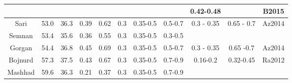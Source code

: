 \begin{table*}[!ht]
\begin{tabular}{ | c | c | c | c | c | c | c | c | c | c | c |}
	 \cline{9-11}	             &  &  &  &  &  &  & & 0.42-0.48 &  & B2015\\ \hline
	 Sari          & 53.0   & 36.3   & 0.39   & 0.62  & 0.3 & 0.35-0.5 &0.5-0.7& 0.3 - 0.35 &  0.65 - 0.7 & Az2014\\ \hline
	 Semnan   & 53.4   & 35.6   & 0.36   & 0.55  & 0.3 & 0.35-0.5 &0.3-0.5&  & & \\ \hline
	 Gorgan    & 54.4   & 36.8    & 0.45  & 0.69  & 0.3 & 0.35-0.5 &0.5-0.7& 0.3 - 0.35 &  0.65 -0.7 & Az2014\\ \hline
	 Bojnurd   & 57.3    & 37.5    & 0.43  & 0.67  & 0.3 & 0.35-0.5 &0.7-0.9&0.16-0.2  & 0.32-0.45  & Ra2012  \\ \hline
	 Mashhad & 59.6     & 36.3   & 0.21 & 0.37  & 0.3 & 0.35-0.5 &0.7-0.9  &  &&  \\ \hline
\end{tabular}
\label{tab:pga_values}
\end{table*}










